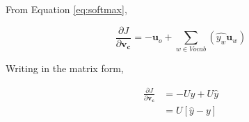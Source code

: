 \documentclass{article}
\begin{document}
\begin{enumerate}[label=(\alph*)]
		From Equation \ref{eq:softmax},
		
		\begin{equation}
			\frac{\partial J}{\partial \bm{v_c}} = - \bm{u}_o + \sum\limits_{w \in {Vocab}}(\hat{y_w} \bm{u}_w)		
		\end{equation}
		
		Writing in the matrix form,
		
		\begin{equation}
		\begin{split}
		\frac{\partial J}{\partial \bm{v_c}} &= - Uy + U\hat{y}\\ 
											 &= U[\hat{y}-y]	
		\end{split}
		\end{equation}
	\end{enumerate}
	
	
	
\end{document}

